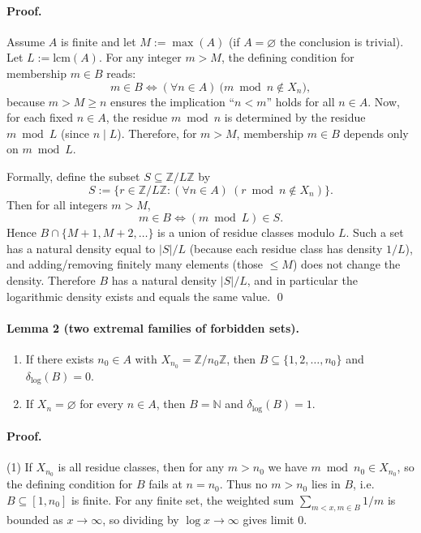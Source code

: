 \paragraph{Proof.}
Assume $A$ is finite and let $M:=\max(A)$ (if $A=\varnothing$ the conclusion is trivial).
Let $L:=\mathrm{lcm}(A)$.
For any integer $m>M$, the defining condition for membership $m\in B$ reads:
\[m\in B \iff (\forall n\in A)\ \bigl(m\bmod n\not\in X_n\bigr),\]
because $m>M\ge n$ ensures the implication ``$n<m$'' holds for all $n\in A$.
Now, for each fixed $n\in A$, the residue $m\bmod n$ is determined by the residue $m\bmod L$ (since $n\mid L$).
Therefore, for $m>M$, membership $m\in B$ depends only on $m\bmod L$.

Formally, define the subset $S\subseteq \mathbb{Z}/L\mathbb{Z}$ by
\[S := \{ r\in \mathbb{Z}/L\mathbb{Z} : (\forall n\in A)\ (r\bmod n \not\in X_n)\}.
\]
Then for all integers $m>M$,
\[m\in B \iff (m\bmod L)\in S.
\]
Hence $B\cap\{M+1,M+2,\dots\}$ is a union of residue classes modulo $L$.
Such a set has a natural density equal to $|S|/L$ (because each residue class has density $1/L$), and adding/removing finitely many elements (those $\le M$) does not change the density.
Therefore $B$ has a natural density $|S|/L$, and in particular the logarithmic density exists and equals the same value.
\qed

\paragraph{Lemma 2 (two extremal families of forbidden sets).}
\begin{enumerate}
\item If there exists $n_0\in A$ with $X_{n_0}=\mathbb{Z}/n_0\mathbb{Z}$, then $B\subseteq\{1,2,\dots,n_0\}$ and $\delta_{\log}(B)=0$.
\item If $X_n=\varnothing$ for every $n\in A$, then $B=\mathbb{N}$ and $\delta_{\log}(B)=1$.
\end{enumerate}

\paragraph{Proof.}
(1) If $X_{n_0}$ is all residue classes, then for any $m>n_0$ we have $m\bmod n_0\in X_{n_0}$, so the defining condition for $B$ fails at $n=n_0$. Thus no $m>n_0$ lies in $B$, i.e. $B\subseteq[1,n_0]$ is finite. For any finite set, the weighted sum $\sum_{m<x,m\in B}1/m$ is bounded as $x\to\infty$, so dividing by $\log x\to\infty$ gives limit $0$.

